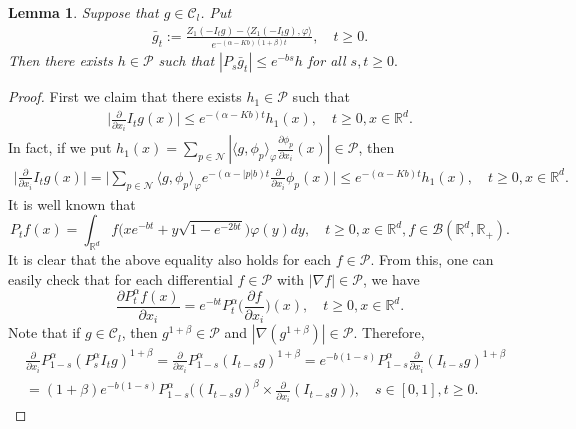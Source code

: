\documentclass[12pt,a4paper]{amsart}
\theoremstyle{plain}
\newtheorem{lem}[thm]{Lemma}
\theoremstyle{definition}
\numberwithin{equation}{section}
\begin{document}
\begin{lem}\label{control of gn} Suppose that $g\in \mathcal{C}_l$.
    Put
\begin{align}
    \bar{g}_t
    :=\frac{Z_1(-I_tg)-\langle Z_1(-I_tg),\varphi\rangle}{e^{-(\alpha-Kb)(1+\beta)t}},\quad t\geq 0.
\end{align}
    Then there exists $h\in \mathcal{P}$ such that
$|P_s\bar{g}_t| \leq e^{-bs}h$ for all $s, t\geq 0.$
\end{lem}
\begin{proof}
    First we claim that there exists $h_1\in \mathcal P$ such that
\begin{align}
\label{ineq: control of partial derivative of Itg}
    \Big|\frac{\partial}{\partial x_i}I_tg(x)\Big| \leq e^{-(\alpha-Kb)t}h_1(x),
    \quad  t\geq 0, x\in \mathbb R^d.
\end{align}
    In fact, if we put $h_1(x)=\sum_{p\in \mathcal N}|\langle g, \phi_p\rangle_\varphi\frac{\partial \phi_p}{\partial x_i}(x)| \in \mathcal P$, then
\begin{align}
    \Big|\frac{\partial}{\partial x_i}I_tg(x)\Big| =
    \Big|\sum_{p\in \mathcal N}\langle g, \phi_p\rangle_\varphi e^{-(\alpha-|p|b)t} \frac{\partial}{\partial x_i}\phi_p(x)\Big|
     \leq e^{-(\alpha-Kb)t}h_1(x),
    \quad t\geq 0, x\in \mathbb R^d.
\end{align}
It is well known that
\[
    P_t f(x) = \int_{\mathbb R^d} f\big(x e^{-bt} + y \sqrt{1-e^{-2bt}}\big) \varphi(y) dy,
    \quad t\geq 0, x\in \mathbb R^d, f\in \mathcal B(\mathbb R^d, \mathbb R_+).
\]
    It is clear that the above equality also holds for each $f\in \mathcal P$.
From this, one can easily check that for each differential $f \in \mathcal P$ with $|\nabla  f| \in \mathcal P$, we have
\[
    \frac{\partial P_t^\alpha f(x)}{\partial x_i} = e^{-bt} P_t^\alpha\Big(\frac{\partial f}{\partial x_i}\Big)(x), \quad t\geq 0, x\in \mathbb R^d.
\]
    Note that if $g \in \mathcal C_l$, then $g^{1+\beta}\in \mathcal P$ and $|\nabla (g^{1+\beta})| \in \mathcal P$.
    Therefore,
\begin{align}
    &\frac{\partial}{\partial x_i} P_{1-s}^\alpha  (P_s^\alpha I_t g)^{1+\beta}
    = \frac{\partial}{\partial x_i} P_{1-s}^\alpha (I_{t-s} g)^{1+\beta}
    = e^{-b(1-s)} P_{1-s}^\alpha \frac{\partial}{\partial x_i} (I_{t-s}g)^{1+\beta}
    \\&=(1+\beta)e^{-b(1-s)} P_{1-s}^\alpha \Big( (I_{t-s}g)^\beta \times \frac{\partial}{\partial x_i} (I_{t-s}g) \Big),\quad s\in [0,1], t\geq 0.

\end{align}
\end{proof}
\end{document}
